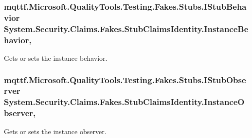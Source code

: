 \hypertarget{class_system_1_1_security_1_1_claims_1_1_fakes_1_1_stub_claims_identity_a7253db985c96680067d4c16cefacbac6}{
\subsubsection[{Instance\-Behavior}]{\setlength{\rightskip}{0pt plus 5cm}mqttf.\-Microsoft.\-Quality\-Tools.\-Testing.\-Fakes.\-Stubs.\-I\-Stub\-Behavior System.\-Security.\-Claims.\-Fakes.\-Stub\-Claims\-Identity.\-Instance\-Behavior\hspace{0.3cm}{\ttfamily [get]}, {\ttfamily [set]}}}\label{class_system_1_1_security_1_1_claims_1_1_fakes_1_1_stub_claims_identity_a7253db985c96680067d4c16cefacbac6}


Gets or sets the instance behavior.

\hypertarget{class_system_1_1_security_1_1_claims_1_1_fakes_1_1_stub_claims_identity_a9c6d9ef290ced9ffc98abb6829c04cfc}{
\subsubsection[{Instance\-Observer}]{\setlength{\rightskip}{0pt plus 5cm}mqttf.\-Microsoft.\-Quality\-Tools.\-Testing.\-Fakes.\-Stubs.\-I\-Stub\-Observer System.\-Security.\-Claims.\-Fakes.\-Stub\-Claims\-Identity.\-Instance\-Observer\hspace{0.3cm}{\ttfamily [get]}, {\ttfamily [set]}}}\label{class_system_1_1_security_1_1_claims_1_1_fakes_1_1_stub_claims_identity_a9c6d9ef290ced9ffc98abb6829c04cfc}


Gets or sets the instance observer.

